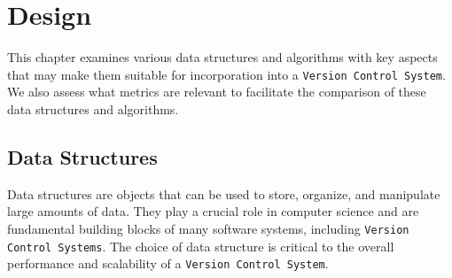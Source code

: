 \lstset{language=bash}
\newpage
\chapter{Design} %
\label{chap:design}
This chapter examines various data structures and algorithms with key aspects that may make them suitable for incorporation into a \lstinline{Version Control System}. We also assess what metrics are relevant to facilitate the comparison of these data structures and algorithms.

% 
% 
% 
\section{Data Structures}
\noindent
Data structures are objects that can be used to store, organize, and manipulate large amounts of data. They play a crucial role in computer science and are fundamental building blocks of many software systems, including \lstinline{Version Control Systems}. The choice of data structure is critical to the overall performance and scalability of a \lstinline{Version Control System}.

